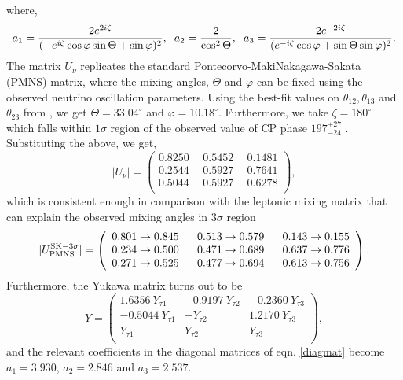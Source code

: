 \documentclass[aps, a4paper,superscriptaddress,12pt,preprintnumbers,floatfix,nofootinbib,amsmath,amssymb]{revtex4}
\begin{document}
where,
\begin{eqnarray}
a_1 = \frac{2 e^{2i\zeta}}{(-e^{i\zeta}\cos \varphi \sin \Theta+\sin \varphi)^2}, \hspace{0.2 cm} a_2 = \frac{2}{\cos^2\Theta}, \hspace{0.2 cm} a_3 = \frac{2 e^{-2i\zeta}}{(e^{-i\zeta}\cos \varphi + \sin \Theta\sin \varphi)^2}.
\end{eqnarray}
The matrix $U_\nu$ replicates the standard Pontecorvo-MakiNakagawa-Sakata (PMNS) matrix, where the mixing angles, $\Theta$ and $\varphi$ can be fixed using the observed neutrino oscillation parameters. Using the best-fit values on $\theta_{12},\theta_{13}$ and $\theta_{23}$ from \cite{Esteban:2020cvm}, we get $\Theta = 33.04^\circ$ and $\varphi = 10.18^\circ$. Furthermore, we take $\zeta = 180^\circ$ which falls within $1\sigma$ region of the observed value of CP phase $197^{+27}_{-24}$ \cite{Esteban:2020cvm}. Substituting the above, we get, 
\begin{equation}
|U_\nu|=\left(\begin{array}{ccc}
0.8250 ~&~ 0.5452 ~&~ 0.1481 \\
0.2544 ~&~ 0.5927 ~&~ 0.7641\\
0.5044 ~&~ 0.5927 ~&~ 0.6278\\
\end{array}\right),
\end{equation}
which is consistent enough in comparison with the leptonic mixing matrix that can explain the observed mixing angles in $3\sigma$ region \cite{Esteban:2020cvm} 
\begin{equation}
|U^{{\rm SK}-3\sigma}_{\rm PMNS}|=\left(\begin{array}{ccc}
0.801 \to 0.845 ~&~ 0.513 \to 0.579 ~&~ 0.143 \to 0.155 \\
0.234 \to 0.500 ~&~ 0.471 \to 0.689 ~&~ 0.637 \to 0.776\\
0.271 \to 0.525 ~&~ 0.477 \to 0.694 ~&~ 0.613 \to 0.756\\
\end{array}\right).
\end{equation}
Furthermore, the Yukawa matrix turns out to be
\begin{equation}
Y=\left(\begin{array}{ccc}
1.6356~ Y_{\tau 1} & -0.9197~ Y_{\tau 2} & -0.2360~ Y_{\tau 3}\\
-0.5044~ Y_{\tau 1}& -Y_{\tau 2} & 1.2170~ Y_{\tau 3}\\
 Y_{\tau 1} & Y_{\tau 2} & Y_{\tau 3}\\
\end{array}\right),
\end{equation}
and the relevant coefficients in the diagonal matrices of eqn. \ref{diagmat} become $a_1 = 3.930$, $a_2 = 2.846$ and $a_3 = 2.537$.
\end{document}
